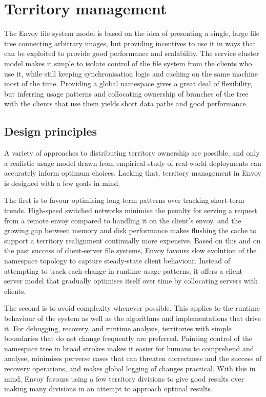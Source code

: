 \section{Territory management}\label{sec:territory-management}

The Envoy file system model is based on the idea of presenting a single, large file tree connecting arbitrary images, but providing incentives to use it in ways that can be exploited to provide good performance and scalability. The service cluster model makes it simple to isolate control of the file system from the clients who use it, while still keeping synchronisation logic and caching on the same machine most of the time. Providing a global namespace gives a great deal of flexibility, but inferring usage patterns and collocating ownership of branches of the tree with the clients that use them yields short data paths and good performance.

\subsection{Design principles}

A variety of approaches to distributing territory ownership are possible, and only a realistic usage model drawn from empirical study of real-world deployments can accurately inform optimum choices. Lacking that, territory management in Envoy is designed with a few goals in mind.

The first is to favour optimising long-term patterns over tracking short-term trends. High-speed switched networks minimise the penalty for serving a request from a remote envoy compared to handling it on the client's envoy, and the growing gap between memory and disk performance makes flushing the cache to support a territory realignment continually more expensive. Based on this and on the past success of client-server file systems, Envoy favours slow evolution of the namespace topology to capture steady-state client behaviour. Instead of attempting to track each change in runtime usage patterns, it offers a client-server model that gradually optimises itself over time by collocating servers with clients.

The second is to avoid complexity whenever possible. This applies to the runtime behaviour of the system as well as the algorithms and implementations that drive it. For debugging, recovery, and runtime analysis, territories with simple boundaries that do not change frequently are preferred. Painting control of the namespace tree in broad strokes makes it easier for humans to comprehend and analyse, minimises perverse cases that can threaten correctness and the success of recovery operations, and makes global logging of changes practical. With this in mind, Envoy favours using a few territory divisions to give good results over making many divisions in an attempt to approach optimal results.

